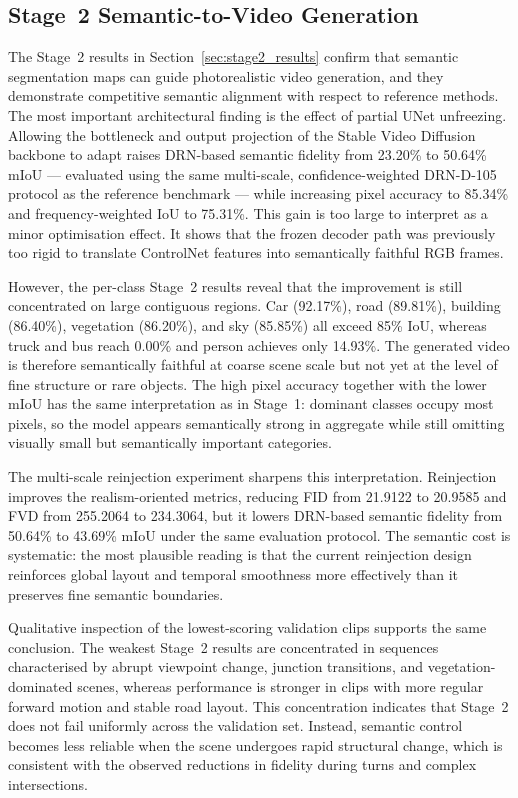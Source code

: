 \subsection{Stage~2 Semantic-to-Video Generation}
\label{subsec:stage2_discussion}

The Stage~2 results in Section~\ref{sec:stage2_results} confirm that semantic segmentation maps can guide photorealistic video generation, and they demonstrate competitive semantic alignment with respect to reference methods. The most important architectural finding is the effect of partial UNet unfreezing. Allowing the bottleneck and output projection of the Stable Video Diffusion backbone to adapt raises DRN-based semantic fidelity from 23.20\% to 50.64\% mIoU — evaluated using the same multi-scale, confidence-weighted DRN-D-105 protocol as the reference benchmark — while increasing pixel accuracy to 85.34\% and frequency-weighted IoU to 75.31\%. This gain is too large to interpret as a minor optimisation effect. It shows that the frozen decoder path was previously too rigid to translate ControlNet features into semantically faithful RGB frames.

However, the per-class Stage~2 results reveal that the improvement is still concentrated on large contiguous regions. Car (92.17\%), road (89.81\%), building (86.40\%), vegetation (86.20\%), and sky (85.85\%) all exceed 85\% IoU, whereas truck and bus reach 0.00\% and person achieves only 14.93\%. The generated video is therefore semantically faithful at coarse scene scale but not yet at the level of fine structure or rare objects. The high pixel accuracy together with the lower mIoU has the same interpretation as in Stage~1: dominant classes occupy most pixels, so the model appears semantically strong in aggregate while still omitting visually small but semantically important categories.

The multi-scale reinjection experiment sharpens this interpretation. Reinjection improves the realism-oriented metrics, reducing FID from 21.9122 to 20.9585 and FVD from 255.2064 to 234.3064, but it lowers DRN-based semantic fidelity from 50.64\% to 43.69\% mIoU under the same evaluation protocol. The semantic cost is systematic: the most plausible reading is that the current reinjection design reinforces global layout and temporal smoothness more effectively than it preserves fine semantic boundaries.

Qualitative inspection of the lowest-scoring validation clips supports the same conclusion. The weakest Stage~2 results are concentrated in sequences characterised by abrupt viewpoint change, junction transitions, and vegetation-dominated scenes, whereas performance is stronger in clips with more regular forward motion and stable road layout. This concentration indicates that Stage~2 does not fail uniformly across the validation set. Instead, semantic control becomes less reliable when the scene undergoes rapid structural change, which is consistent with the observed reductions in fidelity during turns and complex intersections.

